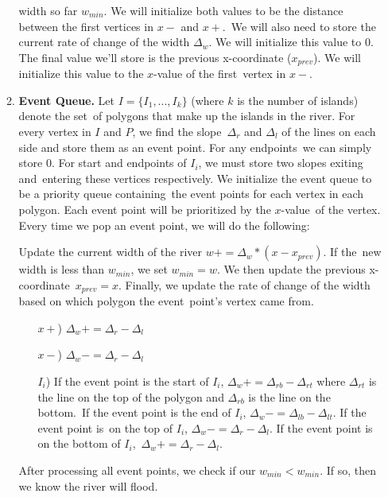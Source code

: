 \documentclass[11pt]{article}
\begin{document}
\begin{solution}
\begin{enumerate}
\begin{enumerate}
        width so far \(w_{min}\). We will initialize both values to be the distance between the first vertices in \(x-\) and \(x+\).\
        We will also need to store the current rate of change of the width \(\Delta_w\). We will initialize this value to 0.
        The final value we'll store is the previous x-coordinate (\(x_{prev}\)). We will initialize this value to the \(x\)-value of the first\
        vertex in \(x-\).
        \item \textbf{Event Queue.} Let \(I = \{I_1, ..., I_k\}\) (where \(k\) is the number of islands) denote the set\
        of polygons that make up the islands in the river. For every vertex in \(I\) and \(P\), we find the slope\
        \(\Delta_r\) and \(\Delta_l\) of the lines on each side and store them as an event point. For any endpoints\
        we can simply store 0. For start and endpoints of \(I_i\), we must store two slopes exiting and\
        entering these vertices respectively. We initialize the event queue to be a priority queue containing\
        the event points for each vertex in each polygon. Each event point will be prioritized by the \(x\)-value\
        of the vertex. Every time we pop an event point, we will do the following:

        Update the current width of the river \(w += \Delta_w * (x - x_{prev})\). If the\
        new width is less than \(w_{min}\), we set \(w_{min} = w\). We then update the previous x-coordinate\
        \(x_{prev} = x\). Finally, we update the rate of change of the width based on which polygon the event\
        point's vertex came from.
        \begin{enumerate}
          \item[\(x+\))] \(\Delta_w += \Delta_r - \Delta_l\)
          \item[\(x-\))] \(\Delta_w -= \Delta_r - \Delta_l\)
          \item[\(I_i\))] If the event point is the start of \(I_i\), \(\Delta_w += \Delta_{rb} - \Delta_{rt}\)
          where \(\Delta_{rt}\) is the line on the top of the polygon and \(\Delta_{rb}\) is the line on the bottom.\
          If the event point is the end of \(I_i\), \(\Delta_w -= \Delta_{lb} - \Delta_{lt}\). If the event point is\
          on the top of \(I_i\), \(\Delta_w -= \Delta_r - \Delta_l\). If the event point is on the bottom of \(I_i\),\
          \(\Delta_w += \Delta_r - \Delta_l\).
        \end{enumerate}
        After processing all event points, we check if our \(w_{min} < w_{min}\). If so, then we know the river will flood.
      \end{enumerate}
  \end{enumerate}
\end{solution}
\end{document}

